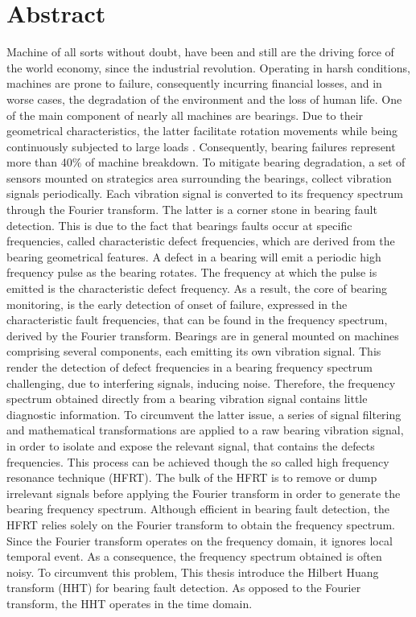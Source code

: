 \documentclass[../Main/thesis.tex]{subfiles}
\begin{document}
\null\vfill
{}
\chapter*{Abstract}
Machine of all sorts without doubt, have been and still are the driving force of the world economy, since the industrial revolution.
Operating in harsh conditions, machines are prone to failure, consequently incurring financial losses, and in worse cases, the degradation of the environment and the loss of human life. 
\justify
 One of the main component of nearly all machines are bearings. Due to their  geometrical characteristics, the latter facilitate rotation movements while being continuously subjected to large loads . Consequently, bearing failures represent more than 40$\%$ of machine breakdown. To mitigate
 bearing degradation, a set of sensors mounted on strategics area surrounding the bearings, collect vibration signals periodically. Each vibration signal is converted to its frequency spectrum through the Fourier transform. The latter is a corner stone in bearing fault detection. This is due to the fact that bearings faults occur at specific frequencies, called characteristic defect frequencies, which are derived from the bearing geometrical features. A defect in a bearing will emit a periodic high frequency pulse as the bearing rotates. The frequency at which the pulse is emitted is the characteristic defect frequency.
 As a result, the core of bearing monitoring, is the early detection of onset of failure, expressed in the characteristic fault frequencies, that can be found in the frequency spectrum, derived by the Fourier transform.
 \justify
 Bearings are in general mounted on machines comprising several components, each emitting its own vibration signal.
 This render the detection of defect frequencies in a bearing frequency spectrum challenging, due to interfering  signals, inducing noise. Therefore, the frequency spectrum obtained directly from a bearing vibration signal contains little diagnostic information. To circumvent the latter issue, a series of signal filtering and mathematical transformations are applied to a raw bearing vibration signal, in order to isolate and expose the relevant signal, that contains the defects frequencies. This process can be achieved though the so called high frequency resonance technique (HFRT). The bulk of the HFRT is to remove or dump irrelevant signals before applying the Fourier transform in order to generate the bearing frequency spectrum.
 \justify
 Although efficient in bearing fault detection, the HFRT relies solely on the Fourier transform to obtain the frequency spectrum. Since the Fourier transform operates on the frequency domain, it ignores local temporal event. As a consequence, the frequency spectrum obtained is often noisy. To circumvent this problem, This thesis introduce the Hilbert Huang transform (HHT) for bearing fault detection. As opposed to the Fourier transform, the HHT operates in the time domain.
\end{document}
